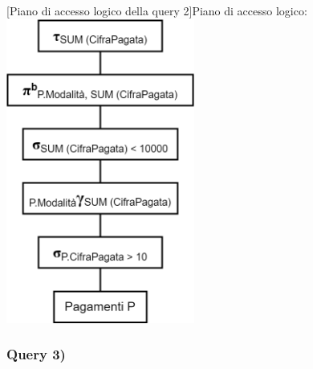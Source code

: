 \documentclass[a4paper,12pt]{article}
\begin{document}
\begin{minipage}{\textwidth}
\begin{multicols}{2}

\null \vfill

\vfill \null

\columnbreak

 [Piano di accesso logico della query 2]{Piano di accesso logico:}
\includegraphics[height=10cm]{ Albero logico 2.png }
\end{multicols}
\end{minipage}

 \subsubsection{ Query 3) }
\end{document}
